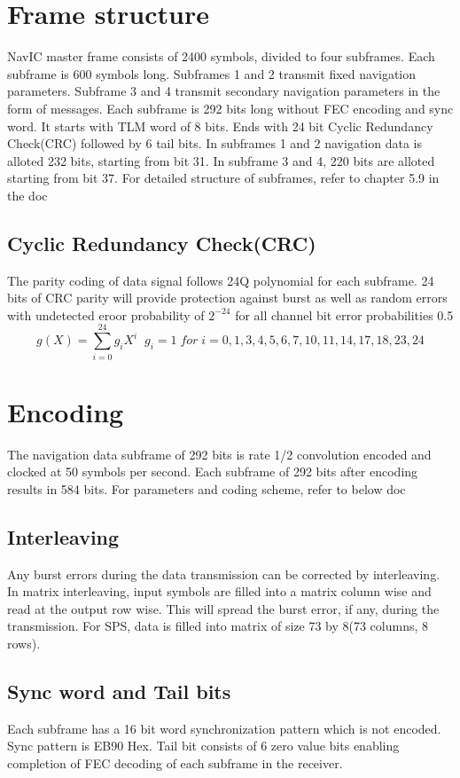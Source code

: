 \section{Frame structure}
NavIC master frame consists of 2400 symbols, divided to four subframes. Each subframe is 600 symbols long. Subframes 1 and 2 transmit fixed navigation parameters. Subframe 3 and 4 transmit secondary navigation parameters in the form of messages. Each subframe is 292 bits long without FEC encoding and sync word. It starts with TLM word of 8 bits. Ends with 24 bit Cyclic Redundancy Check(CRC) followed by 6 tail bits. In subframes 1 and 2 navigation data is alloted 232 bits, starting from bit 31. In subframe 3 and 4, 220 bits are alloted starting from bit 37. For detailed structure of subframes, refer to chapter 5.9 in the doc
\subsection{Cyclic Redundancy Check(CRC)}
The parity coding of data signal follows 24Q polynomial for each subframe. 24 bits of CRC parity will provide protection against burst as well as random errors with undetected eroor probability of $2^{-24}$ for all channel bit error probabilities 0.5
\begin{equation}
    g(X) = \sum_{i = 0}^{24}g_{i}X^i\;\;
    g_{i}=1\; for\; i = 0,1,3,4,5,6,7,10,11,14,17,18,23,24
\end{equation}
\section{Encoding}
The navigation data subframe of 292 bits is rate 1/2 convolution encoded and clocked at 50 symbols per second. Each subframe of 292 bits after encoding results in 584 bits. For parameters and coding scheme, refer to below doc
\subsection{Interleaving}
Any burst errors during the data transmission can be corrected by interleaving. In matrix interleaving, input symbols are filled into a matrix column wise and read at the output row wise. This will spread the burst error, if any, during the transmission. For SPS, data is filled into matrix of size 73 by 8(73 columns, 8 rows).
\subsection{Sync word and Tail bits}
Each subframe has a 16 bit word synchronization pattern which is not encoded. Sync pattern is EB90 Hex. Tail bit consists of 6 zero value bits enabling completion of FEC decoding of each subframe in the receiver.

